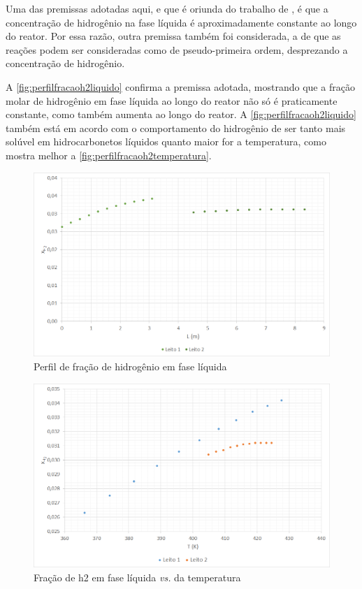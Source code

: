 Uma das premissas adotadas aqui, e que é oriunda do trabalho de
, é que a concentração de hidrogênio na
fase líquida é aproximadamente constante ao longo do reator. Por essa razão,
outra premissa também foi considerada, a de que as reações podem ser
consideradas como de pseudo-primeira ordem, desprezando a concentração de
hidrogênio.

A \autoref{fig:perfilfracaoh2liquido} confirma a premissa adotada, mostrando que
a fração molar de hidrogênio em fase líquida ao longo do reator não só é
praticamente constante, como também aumenta ao longo do reator. A
\autoref{fig:perfilfracaoh2liquido} também está em acordo com o
comportamento do hidrogênio de ser tanto mais solúvel em hidrocarbonetos
líquidos quanto maior for a temperatura, como mostra melhor a
\autoref{fig:perfilfracaoh2temperatura}.

\begin{figure}[htb]
\centering \includegraphics[scale=0.4]{images/Chap4/perfilfracaoh2liquido.png}
\caption{Perfil de fração de hidrogênio em fase líquida}
\label{fig:perfilfracaoh2liquido}
\end{figure}

\begin{figure}[htb]
\centering
\includegraphics[scale=0.4]{images/Chap4/perfilfracaoh2temperatura.png}
\caption{Fração de h2 em fase líquida \emph{vs.} da temperatura}
\label{fig:perfilfracaoh2temperatura}
\end{figure}

